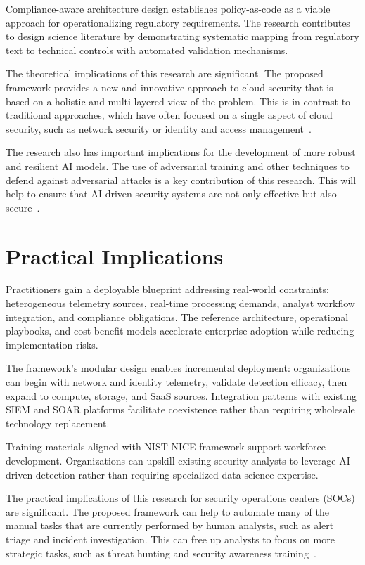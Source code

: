 Compliance-aware architecture design establishes policy-as-code as a viable approach for operationalizing regulatory requirements. The research contributes to design science literature by demonstrating systematic mapping from regulatory text to technical controls with automated validation mechanisms.

The theoretical implications of this research are significant. The proposed framework provides a new and innovative approach to cloud security that is based on a holistic and multi-layered view of the problem. This is in contrast to traditional approaches, which have often focused on a single aspect of cloud security, such as network security or identity and access management~\cite{getastra2024holistic}.

The research also has important implications for the development of more robust and resilient AI models. The use of adversarial training and other techniques to defend against adversarial attacks is a key contribution of this research. This will help to ensure that AI-driven security systems are not only effective but also secure~\cite{cloudpanel2024resilient}.

\section{Practical Implications}\label{sec:conclusion-practice}
Practitioners gain a deployable blueprint addressing real-world constraints: heterogeneous telemetry sources, real-time processing demands, analyst workflow integration, and compliance obligations. The reference architecture, operational playbooks, and cost-benefit models accelerate enterprise adoption while reducing implementation risks.

The framework's modular design enables incremental deployment: organizations can begin with network and identity telemetry, validate detection efficacy, then expand to compute, storage, and SaaS sources. Integration patterns with existing SIEM and SOAR platforms facilitate coexistence rather than requiring wholesale technology replacement.

Training materials aligned with NIST NICE framework support workforce development. Organizations can upskill existing security analysts to leverage AI-driven detection rather than requiring specialized data science expertise.

The practical implications of this research for security operations centers (SOCs) are significant. The proposed framework can help to automate many of the manual tasks that are currently performed by human analysts, such as alert triage and incident investigation. This can free up analysts to focus on more strategic tasks, such as threat hunting and security awareness training~\cite{crowdstrike2024soc}.

